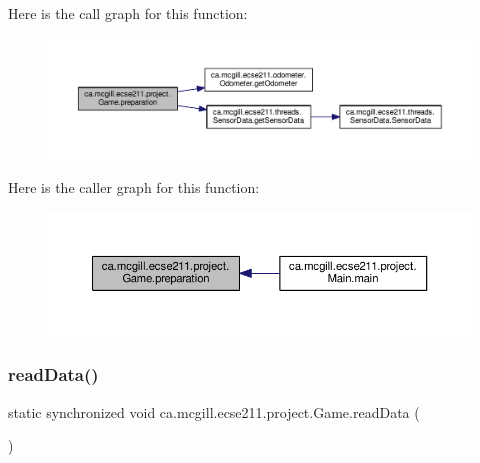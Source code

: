 Here is the call graph for this function\+:
\nopagebreak
\begin{figure}[H]
\begin{center}
\leavevmode
\includegraphics[width=350pt]{classca_1_1mcgill_1_1ecse211_1_1project_1_1_game_a1bcbd1c19309c65a6887ae19bde66765_cgraph}
\end{center}
\end{figure}
Here is the caller graph for this function\+:
\nopagebreak
\begin{figure}[H]
\begin{center}
\leavevmode
\includegraphics[width=350pt]{classca_1_1mcgill_1_1ecse211_1_1project_1_1_game_a1bcbd1c19309c65a6887ae19bde66765_icgraph}
\end{center}
\end{figure}
\mbox{\label{classca_1_1mcgill_1_1ecse211_1_1project_1_1_game_aff9431d27d78c8b228f468d8ad889a9a}} 
\subsubsection{\texorpdfstring{read\+Data()}{readData()}}
{\footnotesize\ttfamily static synchronized void ca.\+mcgill.\+ecse211.\+project.\+Game.\+read\+Data (\begin{DoxyParamCaption}{ }\end{DoxyParamCaption})\hspace{0.3cm}{\ttfamily [static]}}

